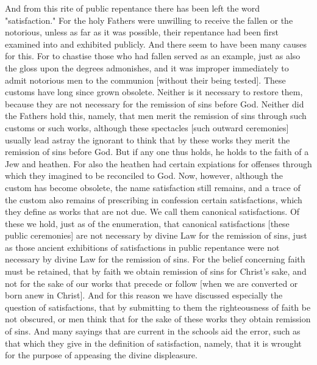 And from this rite of public repentance there has been left the word
"satisfaction." For the holy Fathers were unwilling to receive the
fallen or the notorious, unless as far as it was possible, their
repentance had been first examined into and exhibited publicly.  And
there seem to have been many causes for this.  For to chastise those
who had fallen served as an example, just as also the gloss upon the
degrees admonishes, and it was improper immediately to admit
notorious men to the communion [without their being tested].  These
customs have long since grown obsolete.  Neither is it necessary to
restore them, because they are not necessary for the remission of
sins before God.  Neither did the Fathers hold this, namely, that men
merit the remission of sins through such customs or such works,
although these spectacles [such outward ceremonies] usually lead
astray the ignorant to think that by these works they merit the
remission of sins before God.  But if any one thus holds, he holds to
the faith of a Jew and heathen.  For also the heathen had certain
expiations for offenses through which they imagined to be reconciled
to God.  Now, however, although the custom has become obsolete, the
name satisfaction still remains, and a trace of the custom also
remains of prescribing in confession certain satisfactions, which
they define as works that are not due.  We call them canonical
satisfactions.  Of these we hold, just as of the enumeration, that
canonical satisfactions [these public ceremonies] are not necessary
by divine Law for the remission of sins, just as those ancient
exhibitions of satisfactions in public repentance were not necessary
by divine Law for the remission of sins.  For the belief concerning
faith must be retained, that by faith we obtain remission of sins for
Christ's sake, and not for the sake of our works that precede or
follow [when we are converted or born anew in Christ].  And for this
reason we have discussed especially the question of satisfactions,
that by submitting to them the righteousness of faith be not obscured,
or men think that for the sake of these works they obtain remission
of sins.  And many sayings that are current in the schools aid the
error, such as that which they give in the definition of satisfaction,
namely, that it is wrought for the purpose of appeasing the divine
displeasure.

